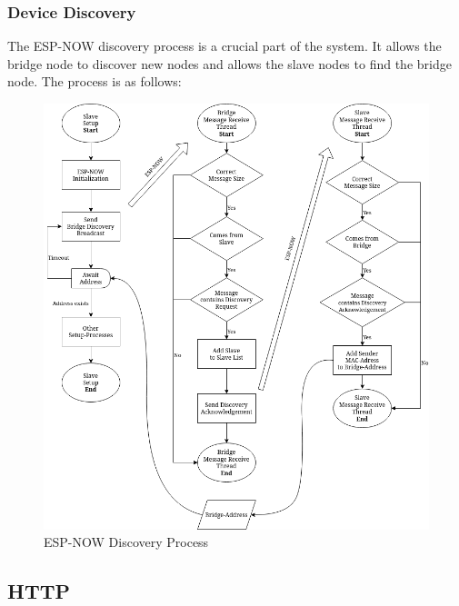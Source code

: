         \subsubsection{Device Discovery}
        The ESP-NOW discovery process is a crucial part of the system. It allows the
        bridge node to discover new nodes and allows the slave nodes to find the bridge
        node. The process is as follows:
        \begin{figure}
            \centering
            \includegraphics[width=\textwidth]{topics/flowcharts/ESP-NOW-Discovery.drawio.png}
            \caption{ESP-NOW Discovery Process}
            \label{fig:espnow_discovery}
        \end{figure}

    \subsection{HTTP} \label{sec:farilib_http}